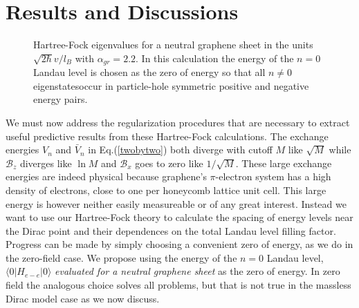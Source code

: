\documentclass{ws-ijmpb}
\begin{document}

\section{Results and Discussions}
\begin{figure}[bt]
\label{figure1}
\centerline{}
\vspace*{8pt}
\caption{Hartree-Fock eigenvalues for a neutral graphene sheet in the units $\sqrt{2 
\hbar}v/l_{B}$ with $\alpha_{gr}=2.2$. In this calculation the energy 
of the $n=0$ Landau level is chosen as the zero of energy so that all $n \ne 0$ 
eigenstatesoccur in particle-hole symmetric positive and negative energy pairs.}
\end{figure}

We must now address the regularization procedures that are necessary to extract 
useful predictive results from these Hartree-Fock calculations.
The exchange energies $V_{n}$ and $\bar{V}_{n}$ in Eq.(\ref{twobytwo}) both 
diverge with cutoff $M$ like $\sqrt{M}$ while $\mathcal{B}_{z}$ 
diverges like $\ln{M}$ and $\mathcal{B}_{x}$ goes to zero like $1/\sqrt{M}$.
These large exchange energies are indeed physical because graphene's 
$\pi$-electron system has a high density of electrons, close to one per 
honeycomb lattice unit cell.  This large energy is however neither easily 
measureable or of any great interest.  Instead we want to use our 
Hartree-Fock theory to calculate the spacing of energy levels 
near the Dirac point and their dependences on the total Landau
level filling factor.  Progress can be made by simply choosing a 
convenient zero of energy, as we do in the zero-field case.  We propose using 
the energy of the $n=0$ Landau level, $\langle 0 | H_{e-e} | 0\rangle$ 
{\em evaluated for a neutral graphene sheet} as the zero of energy.
In zero field the analogous choice solves all problems, but that is not 
true in the massless Dirac model case as we now discuss.
\end{document}
